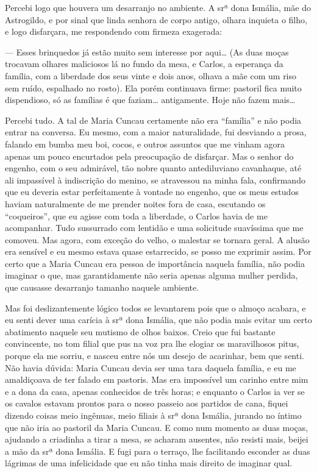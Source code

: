 Percebi logo que houvera um desarranjo no ambiente. A srª dona Ismália,
mãe do Astrogildo, e por sinal que linda senhora de corpo antigo, olhara
inquieta o filho, e logo disfarçara, me respondendo com firmeza
exagerada:

--- Esses brinquedos já estão muito sem interesse por aqui\ldots{} (As duas
moças trocavam olhares maliciosos lá no fundo da mesa, e Carlos, a
esperança da família, com a liberdade dos seus vinte e dois anos, olhava
a mãe com um riso sem ruído, espalhado no rosto). Ela porém continuava
firme: pastoril fica muito dispendioso, só as famílias é que faziam\ldots{}
antigamente. Hoje não fazem mais\ldots{}

Percebi tudo. A tal de Maria Cuncau certamente não era ``família'' e não
podia entrar na conversa. Eu mesmo, com a maior naturalidade, fui
desviando a prosa, falando em bumba meu boi, cocos, e outros assuntos
que me vinham agora apenas um pouco encurtados pela preocupação de
disfarçar. Mas o senhor do engenho, com o seu admirável, tão nobre
quanto antediluviano cavanhaque, até ali impassível à indiscrição do
menino, se atravessou na minha fala, confirmando que eu deveria estar
perfeitamente à vontade no engenho, que os meus estudos haviam
naturalmente de me prender noites fora de casa, escutando os
``coqueiros'', que eu agisse com toda a liberdade, o Carlos havia de me
acompanhar. Tudo sussurrado com lentidão e uma solicitude suavíssima que
me comoveu. Mas agora, com exceção do velho, o malestar se tornara
geral. A alusão era sensível e eu mesmo estava quase estarrecido, se
posso me exprimir assim. Por certo que a Maria Cuncau era pessoa de
importância naquela família, não podia imaginar o que, mas
garantidamente não seria apenas alguma mulher perdida, que causasse
desarranjo tamanho naquele ambiente.

Mas foi deslizantemente lógico todos se levantarem pois que o almoço
acabara, e eu senti dever uma carícia à srª dona Ismália, que não podia
mais evitar um certo abatimento naquele seu mutismo de olhos baixos.
Creio que fui bastante convincente, no tom filial que pus na voz pra lhe
elogiar os maravilhosos pitus, porque ela me sorriu, e nasceu entre nós
um desejo de acarinhar, bem que senti. Não havia dúvida: Maria Cuncau
devia ser uma tara daquela família, e eu me amaldiçoava de ter falado em
pastoris. Mas era impossível um carinho entre mim e a dona da casa,
apenas conhecidos de três horas; e enquanto o Carlos ia ver se os
cavalos estavam prontos para o nosso passeio aos partidos de cana,
fiquei dizendo coisas meio ingênuas, meio filiais à srª dona Ismália,
jurando no íntimo que não iria ao pastoril da Maria Cuncau. E como num
momento as duas moças, ajudando a criadinha a tirar a mesa, se acharam
ausentes, não resisti mais, beijei a mão da srª dona Ismália. E fugi
para o terraço, lhe facilitando esconder as duas lágrimas de uma
infelicidade que eu não tinha mais direito de imaginar qual.

